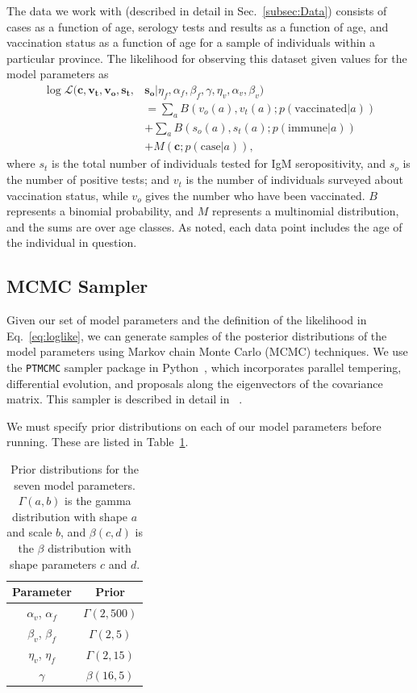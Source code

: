 \documentclass[nofootinbib,aps,pre,twocolumn,superscriptaddress,showkeys,showpacs]{revtex4-1}
\begin{document}
The data we work with (described in detail in Sec.~\ref{subsec:Data}) consists of cases as a function of age, serology tests and results as a function of age, and vaccination status as a function of age for a sample of individuals within a particular province. The likelihood for observing this dataset given values for the model parameters as
\begin{align}
\log \mathcal{L} (\mathbf{c}, \mathbf{v_t}, \mathbf{v_o}, \mathbf{s_t},&\mathbf{s_o}|\eta_f, \alpha_f, \beta_f, \gamma, \eta_v, \alpha_v, \beta_v)\nonumber \\ 
& = \sum_aB\left(v_o(a), v_t(a); p(\mathrm{vaccinated}|a)\right) \nonumber \\
&+ \sum_a B\left(s_o(a),s_t(a);p(\mathrm{immune}|a)\right) \nonumber \\
&+ M\left(\mathbf{c};p(\mathrm{case}|a)\right),
\label{eq:loglike}
\end{align}
where $s_t$ is the total number of individuals tested for IgM seropositivity, and $s_o$ is the number of positive tests; and $v_t$ is the number of individuals surveyed about vaccination status, while $v_o$ gives the number who have been vaccinated. $B$ represents a binomial probability, and $M$ represents a multinomial distribution, and the sums are over age classes. As noted, each data point includes the age of the individual in question.

\subsection{MCMC Sampler \label{subsec:MCMC}}
Given our set of model parameters and the definition of the likelihood in Eq.~\ref{eq:loglike}, we can generate samples of the posterior distributions of the model parameters using Markov chain Monte Carlo (MCMC) techniques. We use the \texttt{PTMCMC} sampler package in Python~\cite{PTMCMC}, which incorporates parallel tempering, differential evolution, and proposals along the eigenvectors of the covariance matrix. This sampler is described in detail in ~\cite{Arzoumanian2014}.

We must specify prior distributions on each of our model parameters before running. These are listed in Table~\ref{table:priors}. 
\begin{table}
\begin{center}
\begin{tabular}{ c|c }  
Parameter & Prior \\
 \hline
 $\alpha_v$, $\alpha_f$ & $\Gamma(2,500)$ \\ 
 $\beta_v$, $\beta_f$ &$ \Gamma(2,5)$ \\ 
 $\eta_v$, $\eta_f$&$ \Gamma(2,15)$ \\ 
 $\gamma$ & $\beta(16,5)$ \\
 \hline
\end{tabular}
\caption{Prior distributions for the seven model parameters. $\Gamma(a,b)$ is the gamma distribution with shape $a$ and scale $b$, and $\beta(c,d)$ is the $\beta$ distribution with shape parameters $c$ and $d$. \label{table:priors}}
\end{center}
\end{table}
\end{document}
